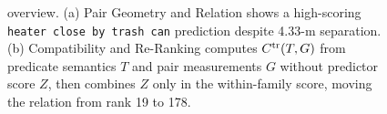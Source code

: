 \begin{figure}[t]
    \centering
\ifdefined\withteaser
    \caption{\method{} overview. (a) Pair Geometry and Relation shows a
    high-scoring \texttt{heater close by trash can} prediction despite 4.33-m
    separation. (b) Compatibility and Re-Ranking computes $\ctr(T,G)$ from
    predicate semantics $T$ and pair measurements $G$ without predictor score
    $Z$, then combines $Z$ only in the within-family score, moving the relation
    from rank 19 to 178.}
\else
    \caption{\method{} overview. (a) Pair Geometry and Relation shows a
    high-scoring \texttt{heater close by trash can} prediction despite 4.33-m
    separation. (b) Compatibility and Re-Ranking computes $\ctr(T,G)$ from
    predicate semantics $T$ and pair measurements $G$ without predictor score
    $Z$, then combines $Z$ only in the within-family score, moving the relation
    from rank 19 to 178.}
\fi
    \label{fig:framework}
\end{figure}
